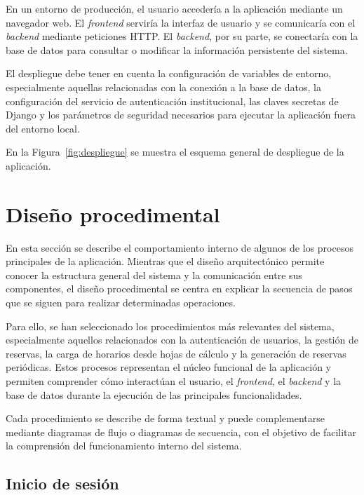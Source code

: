 En un entorno de producción, el usuario accedería a la aplicación mediante un navegador web. El \textit{frontend} serviría la interfaz de usuario y se comunicaría con el \textit{backend} mediante peticiones HTTP. El \textit{backend}, por su parte, se conectaría con la base de datos para consultar o modificar la información persistente del sistema.

El despliegue debe tener en cuenta la configuración de variables de entorno, especialmente aquellas relacionadas con la conexión a la base de datos, la configuración del servicio de autenticación institucional, las claves secretas de Django y los parámetros de seguridad necesarios para ejecutar la aplicación fuera del entorno local.

En la Figura~\ref{fig:despliegue} se muestra el esquema general de despliegue de la aplicación.



\section{Diseño procedimental}

En esta sección se describe el comportamiento interno de algunos de los procesos principales de la aplicación. Mientras que el diseño arquitectónico permite conocer la estructura general del sistema y la comunicación entre sus componentes, el diseño procedimental se centra en explicar la secuencia de pasos que se siguen para realizar determinadas operaciones.

Para ello, se han seleccionado los procedimientos más relevantes del sistema, especialmente aquellos relacionados con la autenticación de usuarios, la gestión de reservas, la carga de horarios desde hojas de cálculo y la generación de reservas periódicas. Estos procesos representan el núcleo funcional de la aplicación y permiten comprender cómo interactúan el usuario, el \textit{frontend}, el \textit{backend} y la base de datos durante la ejecución de las principales funcionalidades.

Cada procedimiento se describe de forma textual y puede complementarse mediante diagramas de flujo o diagramas de secuencia, con el objetivo de facilitar la comprensión del funcionamiento interno del sistema.

\subsection{Inicio de sesión}

